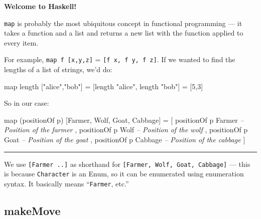 \documentclass[]{article}
\newenvironment{Shaded}{}{}
\newcommand{\DataTypeTok}[1]{\textcolor[rgb]{0.56,0.13,0.00}{{#1}}}
\newcommand{\DecValTok}[1]{\textcolor[rgb]{0.25,0.63,0.44}{{#1}}}
\newcommand{\StringTok}[1]{\textcolor[rgb]{0.25,0.44,0.63}{{#1}}}
\newcommand{\CommentTok}[1]{\textcolor[rgb]{0.38,0.63,0.69}{\textit{{#1}}}}
\newcommand{\FunctionTok}[1]{\textcolor[rgb]{0.02,0.16,0.49}{{#1}}}
\newcommand{\NormalTok}[1]{{#1}}
\begin{document}
\textbf{Welcome to Haskell!}

\texttt{map} is probably the most ubiquitous concept in functional
programming --- it takes a function and a list and returns a new list
with the function applied to every item.

For example, \texttt{map\ f\ {[}x,y,z{]}} =
\texttt{{[}f\ x,\ f\ y,\ f\ z{]}}. If we wanted to find the lengths of a
list of strings, we'd do:

\begin{Shaded}
\begin{Highlighting}[]
\NormalTok{map length [}\StringTok{"alice"}\NormalTok{,}\StringTok{"bob"}\NormalTok{]}
\FunctionTok{=} \NormalTok{[length }\StringTok{"alice"}\NormalTok{, length }\StringTok{"bob"}\NormalTok{]}
\FunctionTok{=} \NormalTok{[}\DecValTok{5}\NormalTok{,}\DecValTok{3}\NormalTok{]}
\end{Highlighting}
\end{Shaded}

So in our case:

\begin{Shaded}
\begin{Highlighting}[]
\NormalTok{map (positionOf p) [}\DataTypeTok{Farmer}\NormalTok{, }\DataTypeTok{Wolf}\NormalTok{, }\DataTypeTok{Goat}\NormalTok{, }\DataTypeTok{Cabbage}\NormalTok{]}
\FunctionTok{=} \NormalTok{[ positionOf p }\DataTypeTok{Farmer}         \CommentTok{-- Position of the farmer}
  \NormalTok{, positionOf p }\DataTypeTok{Wolf}           \CommentTok{-- Position of the wolf}
  \NormalTok{, positionOf p }\DataTypeTok{Goat}           \CommentTok{-- Position of the goat}
  \NormalTok{, positionOf p }\DataTypeTok{Cabbage}        \CommentTok{-- Position of the cabbage}
  \NormalTok{]}
\end{Highlighting}
\end{Shaded}

\begin{center}\rule{0.5\linewidth}{\linethickness}\end{center}

We use \texttt{{[}Farmer\ ..{]}} as shorthand for
\texttt{{[}Farmer,\ Wolf,\ Goat,\ Cabbage{]}} --- this is because
\texttt{Character} is an Enum, so it can be enumerated using enumeration
syntax. It basically means ``\texttt{Farmer}, etc.''

\subsection{makeMove}\label{makemove}
\end{document}
